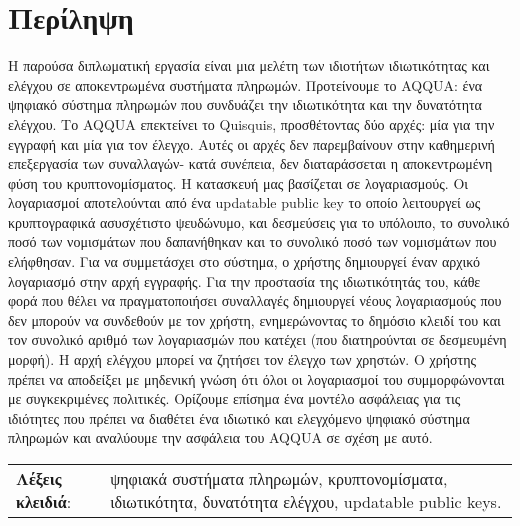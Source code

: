 \chapter*{Περίληψη}
Η παρούσα διπλωματική εργασία είναι μια μελέτη των ιδιοτήτων ιδιωτικότητας και ελέγχου σε αποκεντρωμένα συστήματα πληρωμών.
Προτείνουμε το AQQUA: ένα ψηφιακό σύστημα πληρωμών που συνδυάζει την ιδιωτικότητα και την δυνατότητα ελέγχου.
Το AQQUA επεκτείνει το Quisquis, προσθέτοντας δύο αρχές: μία για την εγγραφή και μία για τον έλεγχο.
Αυτές οι αρχές δεν παρεμβαίνουν στην καθημερινή επεξεργασία των συναλλαγών- κατά συνέπεια, δεν διαταράσσεται η αποκεντρωμένη φύση του κρυπτονομίσματος. 
Η κατασκευή μας βασίζεται σε λογαριασμούς. 
Οι λογαριασμοί αποτελούνται από ένα updatable public key το οποίο λειτουργεί ως κρυπτογραφικά ασυσχέτιστο ψευδώνυμο,
και δεσμεύσεις για το υπόλοιπο, το συνολικό ποσό των νομισμάτων που δαπανήθηκαν και το συνολικό ποσό των νομισμάτων που ελήφθησαν.
Για να συμμετάσχει στο σύστημα, ο χρήστης δημιουργεί έναν αρχικό λογαριασμό στην αρχή εγγραφής. 
Για την προστασία της ιδιωτικότητάς του, κάθε φορά που θέλει να πραγματοποιήσει συναλλαγές δημιουργεί νέους λογαριασμούς που δεν μπορούν να συνδεθούν με τον χρήστη, ενημερώνοντας το δημόσιο κλειδί του και τον συνολικό αριθμό των λογαριασμών που κατέχει (που διατηρούνται σε δεσμευμένη μορφή). 
Η αρχή ελέγχου μπορεί να ζητήσει τον έλεγχο των χρηστών. Ο χρήστης πρέπει να αποδείξει με μηδενική γνώση ότι όλοι οι λογαριασμοί του συμμορφώνονται με συγκεκριμένες πολιτικές.
Ορίζουμε επίσημα ένα μοντέλο ασφάλειας για τις ιδιότητες που πρέπει να διαθέτει ένα ιδιωτικό και ελεγχόμενο ψηφιακό σύστημα πληρωμών και αναλύουμε την ασφάλεια του AQQUA σε σχέση με αυτό. 
\vspace{20ex}

\newlength\mylen
\settowidth{} %

\begin{table}[ht]
    \centering
    \begin{tabular}{p{1.5\mylen} p{\linewidth - 1.5\mylen}}
      \textbf{Λέξεις κλειδιά}: & ψηφιακά συστήματα πληρωμών, κρυπτονομίσματα, ιδιωτικότητα, δυνατότητα ελέγχου, updatable public keys. \\
    \end{tabular}
\end{table}


\newpage
\hspace{10pt}

\newpage
